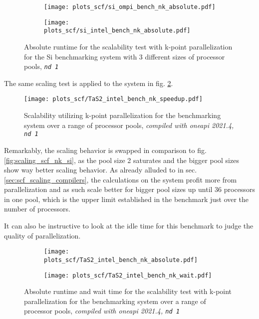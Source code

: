 \documentclass[main.tex]{subfiles}
\begin{document}
\begin{figure}[ht!]
\begin{subfigure}[b]{0.49\textwidth}
    \centering
    \texttt{[image: plots\_scf/si\_ompi\_bench\_nk\_absolute.pdf]}
\end{subfigure}
\begin{subfigure}[b]{0.49\textwidth}
    \centering
    \texttt{[image: plots\_scf/si\_intel\_bench\_nk\_absolute.pdf]}
\end{subfigure}
\caption{Absolute runtime for the scalability test with k-point parallelization for the Si benchmarking system with 3 different sizes of processor pools, \emph{\texttt{nd 1}}}
\label{fig:scaling_scf_nk_si_absolute}
\end{figure}


The same scaling test is applied to the \TaS system in fig. \ref{fig:scaling_scf_nk_tas2}.
\begin{figure}[ht!]
    \centering
    \texttt{[image: plots\_scf/TaS2\_intel\_bench\_nk\_speedup.pdf]}
    \caption{Scalability utilizing k-point parallelization for the \TaS benchmarking system over a range of processor pools, \emph{\QE compiled with \gls{oneapi} 2021.4, \texttt{nd 1}}}
    \label{fig:scaling_scf_nk_tas2}
\end{figure}

Remarkably, the scaling behavior is swapped in comparison to fig. \ref{fig:scaling_scf_nk_si}, as the pool size 2 saturates and the bigger pool sizes show way better scaling behavior.
As already alluded to in sec. \ref{sec:scf_scaling_compilers}, the calculations on the \TaS system profit more from parallelization and as such scale better for bigger pool sizes up until 36 processors in one pool, which is the upper limit established in the benchmark just over the number of processors.


It can also be instructive to look at the idle time for this benchmark to judge the quality of parallelization. 
\begin{figure}[ht!]
    \begin{subfigure}[b]{0.49\textwidth}
        \centering
        \texttt{[image: plots\_scf/TaS2\_intel\_bench\_nk\_absolute.pdf]}
    \end{subfigure}
    \begin{subfigure}[b]{0.49\textwidth}
        \centering
        \texttt{[image: plots\_scf/TaS2\_intel\_bench\_nk\_wait.pdf]}
    \end{subfigure}
    \caption{Absolute runtime and wait time for the scalability test with k-point parallelization for the \TaS benchmarking system over a range of processor pools, \emph{\QE compiled with \gls{oneapi} 2021.4, \texttt{nd 1}}}
    \label{fig:scaling_scf_nk_tas2_absolute_wait}
\end{figure}
\end{document}
